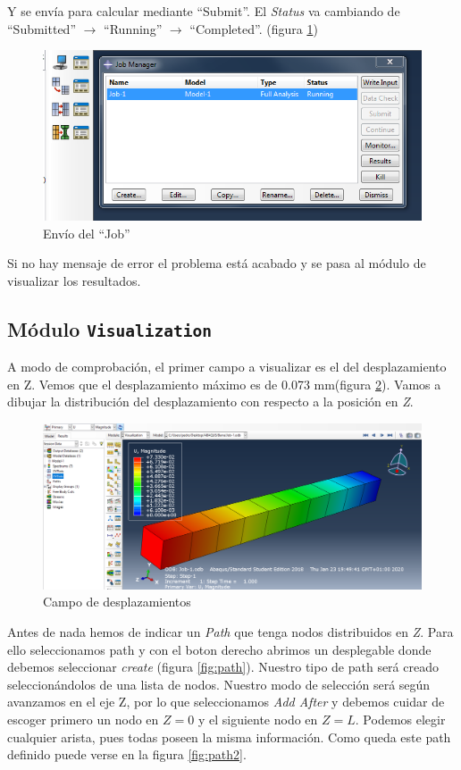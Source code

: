 \documentclass[spanish,a4paper,12pt]{article}
\begin{document}
Y se envía para calcular mediante ``Submit''. El \emph{Status} va cambiando de ``Submitted'' $\to$ ``Running'' $\to$ ``Completed''. 
(figura \ref{fig:job-submit})
\begin{figure}[h!tp]
\centering
\includegraphics[scale=0.5]{capturas/38-job.png}
\caption{Envío del ``Job''}
\label{fig:job-submit}
\end{figure}
Si no hay mensaje de error el problema está acabado y se pasa al módulo de visualizar los resultados.

\clearpage
\subsection{Módulo \texttt{Visualization}}
A modo de comprobación, el primer campo a visualizar es el del desplazamiento en Z. Vemos que el desplazamiento máximo es de 0.073 mm(figura \ref{fig:U}). Vamos a dibujar la distribución del desplazamiento con respecto a la posición en \emph{Z}. 

\begin{figure}[h!tp]
\centering
\includegraphics[scale=0.35]{capturas/res1.png}
\caption{Campo de desplazamientos}
\label{fig:U}%
\end{figure}

Antes de nada hemos de indicar un \emph{Path} que tenga nodos distribuidos en \emph{Z}. Para ello seleccionamos path y con el boton derecho abrimos un desplegable donde debemos seleccionar \emph{create} (figura \ref{fig:path}). Nuestro tipo de path será creado seleccionándolos de una lista de nodos. Nuestro modo de selección será según avanzamos en el eje Z, por lo que seleccionamos \emph{Add After} y debemos cuidar de escoger primero un nodo en $Z=0$ y el siguiente nodo en $Z=L$. Podemos elegir cualquier arista, pues todas poseen la misma información. Como queda este path definido puede verse en la figura \ref{fig:path2}.
\end{document}
